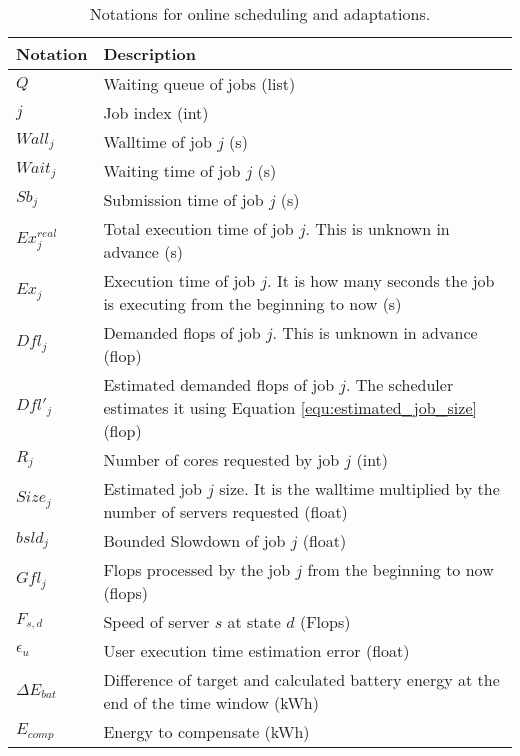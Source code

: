 \begin{table*}[!htb]
\centering
\caption{Notations for online scheduling and adaptations.}
\label{tab:notation_job}
\begin{tabular}{l|p{12cm}}
    \hline
    Notation & Description \\\hline\hline
    $Q$ & Waiting queue of jobs (list)\\
    $j$ & Job index (int)\\
    $Wall_j$ & Walltime of job $j$ (s)\\
    $Wait_j$ & Waiting time of job $j$ (s)\\
    $Sb_j$ & Submission time of job $j$ (s)\\
    $Ex^{real}_j$ & Total execution time of job $j$. This is unknown in advance (s)\\
    $Ex_j$ & Execution time of job $j$. It is how many seconds the job is executing from the beginning to now (s)\\
    $Dfl_j$ & Demanded flops of job $j$. This is unknown in advance (flop)\\
    $Dfl'_j$ & Estimated demanded flops of job $j$. The scheduler estimates it using Equation \ref{equ:estimated_job_size} (flop)\\
    $R_j$ & Number of cores requested by job $j$ (int) \\
    $Size_j$ & Estimated job $j$ size. It is the walltime multiplied by the number of servers requested (float)\\
    $bsld_j$ & Bounded Slowdown of job $j$ (float)\\
    $Gfl_j$ & Flops processed by the job $j$ from the beginning to now (flops)\\
    $F_{s,d}$ & Speed of server $s$ at state $d$ (Flops)\\
    $\epsilon_{u}$ & User execution time estimation error (float)\\
    $\Delta E_{bat}$ & Difference of target and calculated battery energy at the end of the time window (kWh)\\
    $E_{comp}$ & Energy to compensate (kWh)\\
    \hline
\end{tabular}
\end{table*}